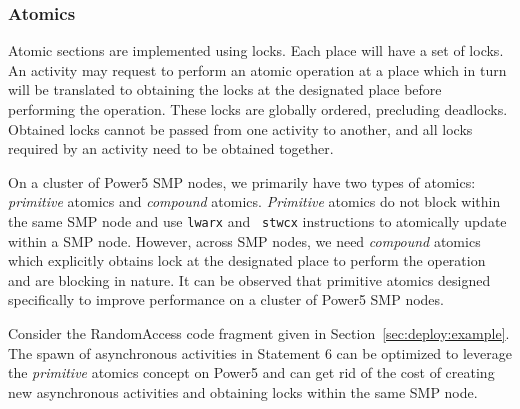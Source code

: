 \subsubsection{Atomics}
Atomic sections are implemented using locks. Each place will have 
a set of locks.  An activity may request to 
perform an atomic operation at a place which in turn will be
translated to obtaining the locks at the designated place before
performing the operation. These locks are globally ordered,
precluding deadlocks. Obtained locks cannot be passed from one
activity to another, and all locks required by an activity need to be
obtained together. 

On a cluster of Power5 SMP nodes, we primarily have two types of atomics: {\it
primitive} atomics and {\it compound} atomics. {\it Primitive} atomics
do not block within the same SMP node and use {\tt lwarx} and {\tt
stwcx} instructions to atomically update within a SMP node. However,
across SMP nodes, we need {\it compound} atomics which explicitly
obtains lock at the designated place to perform the operation and are
blocking in nature. It can be observed that primitive atomics designed
specifically to improve performance on a cluster of Power5 SMP nodes.

Consider the RandomAccess code fragment given in
Section~\ref{sec:deploy:example}. The spawn of asynchronous activities
in Statement 6 can be optimized to leverage the {\it primitive}
atomics concept on Power5 and can get rid of the cost of creating 
new asynchronous activities and obtaining locks within the same SMP
node.



